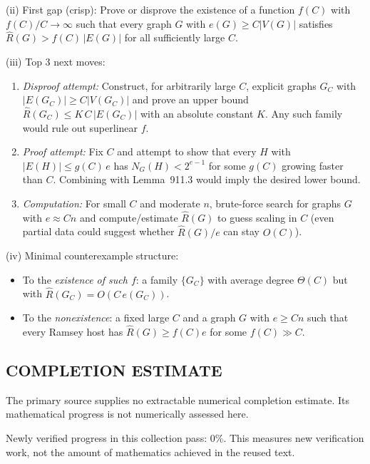 (ii) First gap (crisp): Prove or disprove the existence of a function $f(C)$ with $f(C)/C\to\infty$ such that every graph $G$ with $e(G)\ge C|V(G)|$ satisfies $\hat R(G) > f(C)\,|E(G)|$ for all sufficiently large $C$.

(iii) Top 3 next moves:
\begin{enumerate}
\item \emph{Disproof attempt:} Construct, for arbitrarily large $C$, explicit graphs $G_C$ with $|E(G_C)|\ge C|V(G_C)|$ and prove an upper bound $\hat R(G_C)\le K\,C\,|E(G_C)|$ with an absolute constant $K$. Any such family would rule out superlinear $f$.
\item \emph{Proof attempt:} Fix $C$ and attempt to show that every $H$ with $|E(H)|\le g(C)\,e$ has $N_G(H)<2^{e-1}$ for some $g(C)$ growing faster than $C$. Combining with Lemma~911.3 would imply the desired lower bound.
\item \emph{Computation:} For small $C$ and moderate $n$, brute-force search for graphs $G$ with $e\approx Cn$ and compute/estimate $\hat R(G)$ to guess scaling in $C$ (even partial data could suggest whether $\hat R(G)/e$ can stay $O(C)$).
\end{enumerate}

(iv) Minimal counterexample structure:
\begin{itemize}
\item To the \emph{existence of such $f$}: a family $\{G_C\}$ with average degree $\Theta(C)$ but with $\hat R(G_C)=O(C\,e(G_C))$.
\item To the \emph{nonexistence}: a fixed large $C$ and a graph $G$ with $e\ge Cn$ such that every Ramsey host has $\hat R(G)\ge f(C)e$ for some $f(C)\gg C$.
\end{itemize}




\subsection*{COMPLETION ESTIMATE}
The primary source supplies no extractable numerical completion estimate. Its mathematical progress is not numerically assessed here.

Newly verified progress in this collection pass: $0\%$. This measures new verification work, not the amount of mathematics achieved in the reused text.
